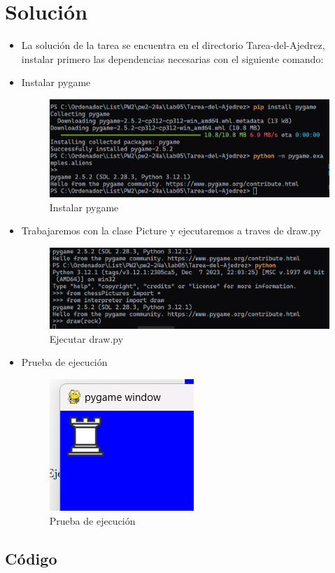 \documentclass{article}
\newenvironment{block}{\captionsetup{type=listing}}{}
\begin{document}
\section{Solución}
\begin{itemize}
	\item La solución de la tarea se encuentra en el directorio Tarea-del-Ajedrez, instalar primero las dependencias necesarias con el siguiente comando:
	\item Instalar pygame
	\begin{figure}[H]
		\centering
		\includegraphics[height=0.3\textwidth]{img/pygame.png}
		\caption{Instalar pygame}
	\end{figure}
	\item Trabajaremos con la clase Picture y ejecutaremos a traves de draw.py
	\begin{figure}[H]
		\centering
		\includegraphics[height=0.25\textwidth]{img/draw.png}
		\caption{Ejecutar draw.py}
	\end{figure}
	\item Prueba de ejecución
	\begin{figure}[H]
		\centering
		\includegraphics[height=0.3\textwidth]{img/drawPrueba.png}
		\caption{Prueba de ejecución}
	\end{figure}
\end{itemize}
\subsection{Código}
\begin{block}
	\inputminted{python}{../Tarea-del-Ajedrez/picture.py}
	\caption{picture.py}
\end{block}
\end{document}
